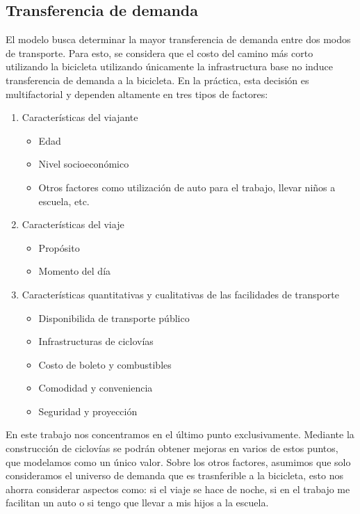 \documentclass{article}
\begin{document}
  \subsection*{Transferencia de demanda}

  El modelo busca determinar la mayor transferencia de demanda entre dos modos de transporte. Para esto, se considera que el costo del camino más corto utilizando la bicicleta utilizando únicamente la infrastructura base no induce transferencia de demanda a la bicicleta. En la práctica, esta decisión es multifactorial y dependen altamente en tres tipos de factores: 

  \begin{enumerate}
    \item{
        Características del viajante
          \begin{itemize}
            \item{Edad}
            \item{Nivel socioeconómico}
            \item{Otros factores como utilización de auto para el trabajo, llevar niños a escuela, etc.}
          \end{itemize}
    }
    \item{
        Características del viaje
          \begin{itemize}
            \item{Propósito}
            \item{Momento del día}
          \end{itemize}
    }
    \item{
        Características quantitativas y cualitativas de las facilidades de transporte
        \begin{itemize}
            \item{Disponibilida de transporte público}
            \item{Infrastructuras de ciclovías}
            \item{Costo de boleto y combustibles}
            \item{Comodidad y conveniencia}
            \item{Seguridad y proyección}
        \end{itemize}
    }
  \end{enumerate}

  En este trabajo nos concentramos en el último punto exclusivamente. Mediante la construcción de ciclovías se podrán obtener mejoras en varios de estos puntos, que modelamos como un único valor. Sobre los otros factores, asumimos que solo consideramos el universo de demanda que es trasnferible a la bicicleta, esto nos ahorra considerar aspectos como: si el viaje se hace de noche, si en el trabajo me facilitan un auto o si tengo que llevar a mis hijos a la escuela.
\end{document}
